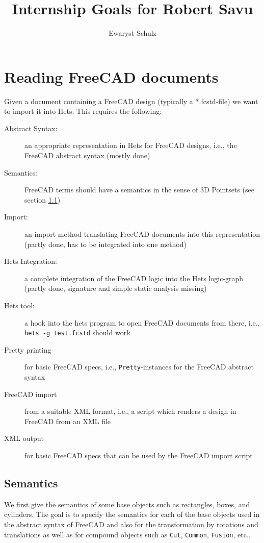 \documentclass[11pt,draft,a4paper]{article}%
\newcommand{\freecad}{FreeCAD\xspace}
\newcommand{\hets}{Hets\xspace}
\newcommand{\bash}[1]{{\tt #1}}
\newcommand{\haskell}[1]{{\tt #1}}
\begin{document}
\title{Internship Goals for Robert Savu}

\author{Ewaryst Schulz}

\maketitle


\section{Reading \freecad documents}
Given a document containing a \freecad design (typically a *.fcstd-file) we want to import it into \hets. This requires the following:
\begin{description}
  \item[Abstract Syntax:] an appropriate representation in \hets for \freecad designs,
    i.e., the \freecad abstract syntax (mostly done)
  \item[Semantics:] \freecad terms should have a semantics in the sense of 3D Pointsets (see section \ref{sec:semantics})
  \item[Import:] an import method translating \freecad documents into this
    representation (partly done, has to be integrated into one method)
  \item[\hets Integration:] a complete integration of the \freecad logic into the \hets
    logic-graph (partly done, signature and simple static analysis missing)
  \item[\hets tool:] a hook into the hets program to open \freecad documents from there, i.e., \bash{hets -g test.fcstd} should work
  \item[Pretty printing] for basic \freecad specs, i.e.,
    \haskell{Pretty}-instances for the \freecad abstract syntax
  \item[FreeCAD import] from a suitable XML format, i.e., a script which renders a design in FreeCAD from an XML file
  \item[XML output] for basic \freecad specs that can be used by the FreeCAD import script
\end{description}

\subsection{Semantics}
\label{sec:semantics}
We first give the semantics of some base objects such as rectangles,
boxes, and cylinders. The goal is to specify the semantics for each of
the base objects used in the abstract syntax of \freecad and also for
the transformation by rotations and translations as well as for
compound objects such as \haskell{Cut}, \haskell{Common},
\haskell{Fusion}, etc..
\end{document}
